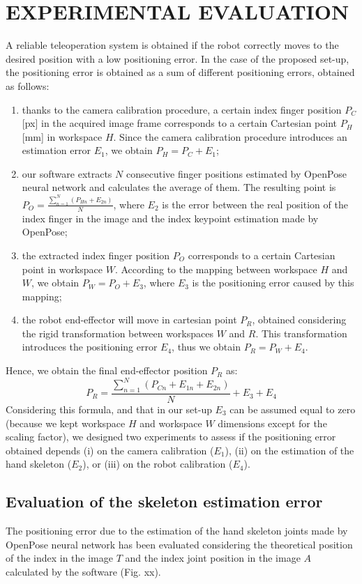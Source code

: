 \documentclass[letterpaper, 10 pt, conference]{ieeeconf}  %
\begin{document}
\section{EXPERIMENTAL EVALUATION}\label{sec:experiments}
A reliable teleoperation system is obtained if the robot correctly moves to the desired position with a low positioning error. In the case of the proposed set-up, the positioning error is obtained as a sum of different positioning errors, obtained as follows:
\begin{enumerate}
\item thanks to the camera calibration procedure, a certain index finger position $P_C$ [px] in the acquired image frame corresponds to a certain Cartesian point $P_H$ [mm] in workspace $H$. Since the camera calibration procedure introduces an estimation error $E_1$, we obtain $P_H = P_C + E_1$;
\item our software extracts $N$ consecutive finger positions estimated by OpenPose neural network and calculates the average of them. The resulting point is $P_O = \frac{\sum_{n=1}^{N}(P_{Hn} + E_{2n})}{N}$, where $E_2$ is the error between the real position of the index finger in the image and the index keypoint estimation made by OpenPose;
\item the extracted index finger position $P_O$ corresponds to a certain Cartesian point in workspace $W$. According to the mapping between workspace $H$ and $W$, we obtain $P_W = P_O + E_3$, where $E_3$ is the positioning error caused by this mapping;
\item the robot end-effector will move in cartesian point $P_R$, obtained considering the rigid transformation between workspaces $W$ and $R$. This transformation introduces the positioning error $E_4$, thus we obtain $P_R = P_W + E_4$.
\end{enumerate}

Hence, we obtain the final end-effector position $P_R$ as: 
\begin{equation}
P_R =\frac{\sum_{n=1}^{N}(P_{Cn} +  E_{1n} +  E_{2n})}{N} + E_3 + E_4
\end{equation}
Considering this formula, and that in our set-up $E_3$ can be assumed equal to zero (because we kept workspace $H$ and workspace $W$ dimensions except for the scaling factor), we designed two experiments to assess if the positioning error obtained depends (i) on the camera calibration ($E_1$), (ii) on the estimation of the hand skeleton ($E_2$), or (iii) on the robot calibration ($E_4$).

\subsection{Evaluation of the skeleton estimation error}
The positioning error due to the estimation of the hand skeleton joints made by OpenPose neural network has been evaluated considering the theoretical position of the index in the image $T$ and the index joint position in the image $A$ calculated by the software (Fig. xx).
\end{document}
